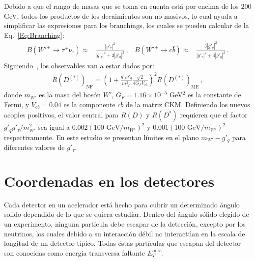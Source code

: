 Debido a que el rango de masas que se toma en cuenta está por encima de los $200$ GeV, todos los productos de los decaimientos son no masivos, lo cual ayuda a simplificar las expresiones para los branchings, los cuales se pueden calcular de la Eq.~\eqref{Eq:Branching}:
%
\begin{align}
B({W'}^+ \to \tau^+\nu_{\tau}) \approx& \frac{|g'_{\tau}|^2}{|g'_{\tau}|^2+3 |g'_q|^2}\,, &
B({W'}^+ \to c\bar{b} ) \approx& \frac{3 |g'_{q}|^2}{|g'_{\tau }|^2+3 |g'_{q}|^2}\,.
\end{align}
%
Siguiendo~\cite{Boucenna:2016qad}, los observables van a estar dados por:
%
\begin{align}
R(D^{(*)})_{\text{NF}} = \left( 1 + \frac{g'_{\tau}g'_q}{m^2_{W'}} \frac{\sqrt{2}}{4 G_F V_{cb}}\right)^2 R(D^{(*)})_{\text{ME}}\,,
\end{align}
%
donde $m_{W'}$ es la masa del bosón $W'$, $G_F = 1.16 \times 10^{-5}$ GeV$^2$ es la constante de Fermi, y $V_{cb} = 0.04$ es la componente $cb$ de la matriz CKM. Definiendo los nuevos acoples positivos, el valor central para $R(D)$ y $R(D^{*})$ requieren que el factor $g'_qg'_{\tau}/m^2_{W'}$ sea igual a $0.002(100\text{ GeV}/m_{W'})^2$ y $0.001(100\text{ GeV}/m_{W'})^2$ respectivamente. En este estudio se presentan límites en el plano $m_{W'}-g'_q$ para diferentes valores de $g'_{\tau}$.

\section{Coordenadas en los detectores}
Cada detector en un acelerador está hecho para cubrir un determinado ángulo solido dependido de lo que se quiera estudiar. Dentro del ángulo sólido elegido de un experimento, ninguna partícula debe escapar de la detección, excepto por los neutrinos, los cuales debido a su interacción débil no interactúan en la escala de longitud de un detector típico. Todas éstas partículas que escapan del detector son conocidas como energía transversa faltante $E^{\text{miss}}_T$.

